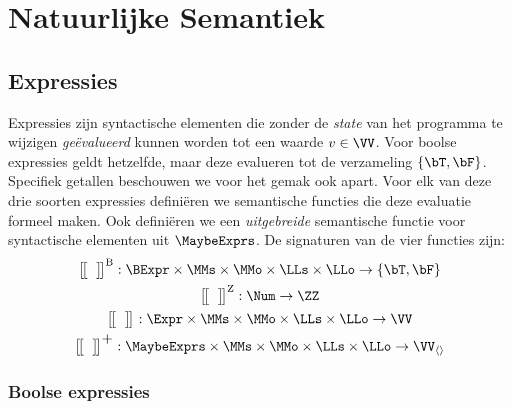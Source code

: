 \chapter{Natuurlijke Semantiek}

\section{Expressies}

Expressies zijn syntactische elementen die zonder de \emph{state} van het programma te wijzigen \emph{geëvalueerd} kunnen worden tot een waarde $v \in \VV$. Voor boolse expressies geldt hetzelfde, maar deze evalueren tot de verzameling $\{\bT, \bF\}$. Specifiek getallen beschouwen we voor het gemak ook apart. Voor elk van deze drie soorten expressies definiëren we semantische functies die deze evaluatie formeel maken. Ook definiëren we een \emph{uitgebreide} semantische functie voor syntactische elementen uit $\MaybeExprs$. De signaturen van de vier functies zijn:
%
\begin{gather*}
  \Express[B]{\;}{} : \BExpr \times \MMs \times \MMo \times \LLs \times \LLo \to \{ \bT, \bF \} \\
  \Express[Z]{\;}{} : \Num \to \ZZ \\
  \Express{\;}{} : \Expr \times \MMs \times \MMo \times \LLs \times \LLo \to \VV \\
  \Express[\scalebox{1.3}{$+$}]{\;}{} : \MaybeExprs \times \MMs \times \MMo \times \LLs \times \LLo \to \VV_{\langle\rangle}
\end{gather*}

\subsection{Boolse expressies}


